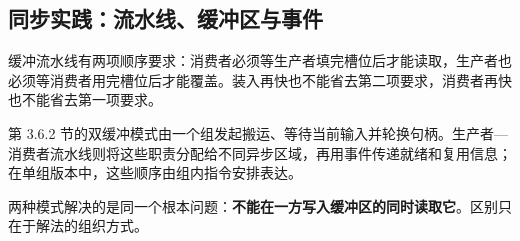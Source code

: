 \subsection*{同步实践：流水线、缓冲区与事件}

缓冲流水线有两项顺序要求：消费者必须等生产者填完槽位后才能读取，生产者也必须等消费者用完槽位后才能覆盖。装入再快也不能省去第二项要求，消费者再快也不能省去第一项要求。

第 3.6.2 节的双缓冲模式由一个组发起搬运、等待当前输入并轮换句柄。生产者—消费者流水线则将这些职责分配给不同异步区域，再用事件传递就绪和复用信息；在单组版本中，这些顺序由组内指令安排表达。

两种模式解决的是同一个根本问题：\textbf{不能在一方写入缓冲区的同时读取它}。区别只在于解法的组织方式。
